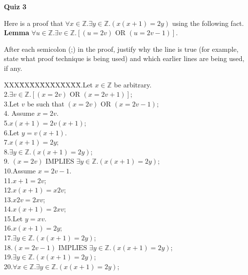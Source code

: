 \documentclass[11pt]{article}
\def\ints{{\mathbb Z}}
\newcommand{\Implies}{\mbox{ IMPLIES }}
\newcommand{\Or}{\mbox{ OR }}
\begin{document}
{\bf \large Quiz 3}

\noindent
Here is a proof that $\forall x \in \ints. \exists y \in \ints. (x(x+1) = 2y)$
using the following fact.\\[5pt]
{\bf Lemma} $\forall u \in \ints. \exists v \in \ints. [ (u = 2v) \Or (u= 2v-1)]$.

\noindent
After each semicolon (;) in the proof, justify why the line is true
(for example, state what proof technique is being used)
and  which earlier lines are being used, if any.

\begin{tabbing}
XXX\=XX\=XX\=XX\=XX\=XX\=XX\=.\>\>Let $x \in \ints$ be arbitrary.\\[5pt]
 2.\>\>$\exists v \in \ints. [ (x = 2v) \Or (x= 2v+1)]$;\\[5pt]
 3.\>\>\>Let $v$ be such that $(x = 2v) \Or (x= 2v-1)$;\\[5pt]
 4.\>\>\>\> Assume  $x = 2v$.\\[5pt]
 5.\>\>\>\>$x(x+1) = 2v(x+1)$; \\[5pt]
 6.\>\>\>\>\>Let $y =v(x+1)$.\\[5pt]
 7.\>\>\>\>\>$x(x+1) = 2y$; \\[5pt]
 8.\>\>\>\>$\exists y \in \ints. (x(x+1) = 2y)$; \\[5pt]
 9. \>\>\>$(x = 2v) \Implies \exists y \in \ints. (x(x+1) = 2y)$; \\[5pt]
10.\>\>\>\>Assume  $x = 2v-1$.\\[5pt]
11.\>\>\>\>$x+1 = 2v$; \\[5pt]
12.\>\>\>\>$x(x+1) = x2v$;\\[5pt]
13.\>\>\>\>$x2v = 2xv$; \\[5pt]
14.\>\>\>\>$x(x+1) = 2xv$; \\[5pt]
15.\>\>\>\>\>Let $y = xv$.\\[5pt]
16.\>\>\>\>\>$x(x+1) = 2y$; \\[5pt]
17.\>\>\>\>$\exists y \in \ints. (x(x+1) = 2y)$; \\[5pt]
18.\>\>\>$(x = 2v-1) \Implies \exists y \in \ints. (x(x+1) = 2y)$; \\[5pt]
19.\>\>\>$\exists y \in \ints. (x(x+1) = 2y)$; \\[5pt]
20.\>$\forall x \in \ints. \exists y \in \ints. (x(x+1) = 2y)$;
\end{tabbing}
\end{document}
